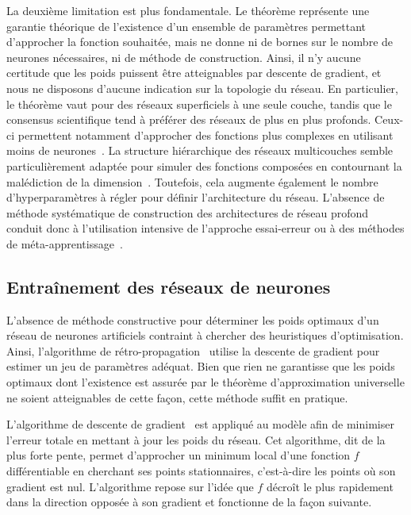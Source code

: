 La deuxième limitation est plus fondamentale. Le théorème représente une garantie théorique de l'existence d'un ensemble de paramètres permettant d'approcher la fonction souhaitée, mais ne donne ni de bornes sur le nombre de neurones nécessaires, ni de méthode de construction. Ainsi, il n'y aucune certitude que les poids puissent être atteignables par descente de gradient, et nous ne disposons d'aucune indication sur la topologie du réseau. En particulier, le théorème vaut pour des réseaux superficiels à une seule couche, tandis que le consensus scientifique tend à préférer des réseaux de plus en plus profonds. Ceux-ci permettent notamment d'approcher des fonctions plus complexes en utilisant moins de neurones~\cite{bianchini_complexity_2014,mhaskar_when_2017}. La structure hiérarchique des réseaux multicouches semble particulièrement adaptée pour simuler des fonctions composées en contournant la malédiction de la dimension~\cite{poggio_why_2017}. Toutefois, cela augmente également le nombre d'hyperparamètres à régler pour définir l'architecture du réseau. L'absence de méthode systématique de construction des architectures de réseau profond conduit donc à l'utilisation intensive de l'approche essai-erreur ou à des méthodes de méta-apprentissage~\cite{zoph_neural_2017}.

\subsection{Entraînement des réseaux de neurones}

L'absence de méthode constructive pour déterminer les poids optimaux d'un réseau de neurones artificiels contraint à chercher des heuristiques d'optimisation. Ainsi, l'algorithme de rétro-propagation~\cite{werbos_beyond_1975,rumelhart_learning_1986,lecun_learning_1986} utilise la descente de gradient pour estimer un jeu de paramètres adéquat. Bien que rien ne garantisse que les poids optimaux dont l'existence est assurée par le théorème d'approximation universelle ne soient atteignables de cette façon, cette méthode suffit en pratique.

L'algorithme de descente de gradient~\cite{cauchy_comptes_1847} est appliqué au modèle afin de minimiser l'erreur totale en mettant à jour les poids du réseau. Cet algorithme, dit de la plus forte pente, permet d'approcher un minimum local d'une fonction $f$ différentiable en cherchant ses points stationnaires, c'est-à-dire les points où son gradient est nul. L'algorithme repose sur l'idée que $f$ décroît le plus rapidement dans la direction opposée à son gradient et fonctionne de la façon suivante.

